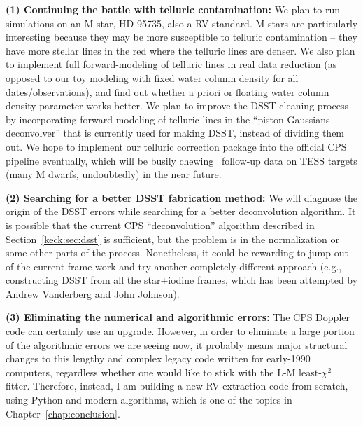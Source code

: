 {\bf (1) Continuing the battle with telluric contamination: } We plan
to run simulations on an M star, HD 95735, also a RV standard. M stars
are particularly interesting because they may be more susceptible to
telluric contamination -- they have more stellar lines in the red
where the telluric lines are denser. We also plan to implement full
forward-modeling of telluric lines in real data reduction (as opposed
to our toy modeling with fixed water column density for all
dates/observations), and find out whether a priori or floating water
column density parameter works better. We plan to improve the DSST
cleaning process by incorporating forward modeling of telluric lines
in the ``piston Gaussians deconvolver'' that is currently used for
making DSST, instead of dividing them out. We hope to implement our
telluric correction package into the official CPS pipeline eventually,
which will be busily chewing \keck\ follow-up data on TESS targets
(many M dwarfs, undoubtedly) in the near future.

{\bf (2) Searching for a better DSST fabrication method: } We will
diagnose the origin of the DSST errors while searching for a better
deconvolution algorithm. It is possible that the current CPS
``deconvolution'' algorithm described in Section~\ref{keck:sec:dsst}
is sufficient, but the problem is in the normalization or some other
parts of the process. Nonetheless, it could be rewarding to jump out
of the current frame work and try another completely different
approach (e.g., constructing DSST from all the star$+$iodine frames,
which has been attempted by Andrew Vanderberg and John Johnson).

{\bf (3) Eliminating the numerical and algorithmic errors: } The CPS
Doppler code can certainly use an upgrade. However, in order to
eliminate a large portion of the algorithmic errors we are seeing now,
it probably means major structural changes to this lengthy and complex
legacy code written for early-1990 computers, regardless whether one
would like to stick with the L-M least-$\chi^2$ fitter. Therefore,
instead, I am building a new RV extraction code from scratch, using
Python and modern algorithms, which is one of the topics in
Chapter~\ref{chap:conclusion}.



